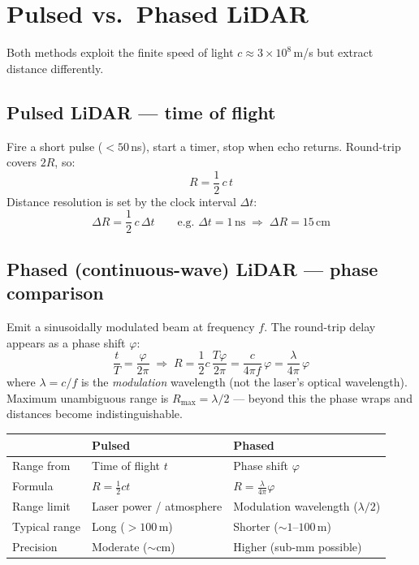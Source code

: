 \documentclass[12pt, a4paper]{article}
\begin{document}
\section*{Pulsed vs.\ Phased LiDAR}

Both methods exploit the finite speed of light $c \approx 3\times10^8$\,m/s but
extract distance differently.

\subsection*{Pulsed LiDAR --- time of flight}

Fire a short pulse ($<50$\,ns), start a timer, stop when echo returns.
Round-trip covers $2R$, so:
\[
  R = \frac{1}{2}\,c\,t
\]
Distance resolution is set by the clock interval $\Delta t$:
\[
  \Delta R = \frac{1}{2}\,c\,\Delta t
  \qquad \text{e.g.\ } \Delta t = 1\,\text{ns} \;\Rightarrow\; \Delta R = 15\,\text{cm}
\]

\subsection*{Phased (continuous-wave) LiDAR --- phase comparison}

Emit a sinusoidally modulated beam at frequency $f$.
The round-trip delay appears as a phase shift $\varphi$:
\[
  \frac{t}{T} = \frac{\varphi}{2\pi}
  \;\Longrightarrow\;
  R = \frac{1}{2}c\,\frac{T\varphi}{2\pi}
    = \frac{c}{4\pi f}\,\varphi
    = \frac{\lambda}{4\pi}\,\varphi
\]
where $\lambda = c/f$ is the \emph{modulation} wavelength (not the laser's
optical wavelength). Maximum unambiguous range is $R_{\max} = \lambda/2$
--- beyond this the phase wraps and distances become indistinguishable.

\begin{center}
\renewcommand{\arraystretch}{1.4}
\begin{tabular}{lll}
  \toprule
  & \textbf{Pulsed} & \textbf{Phased} \\
  \midrule
  Range from      & Time of flight $t$          & Phase shift $\varphi$ \\
  Formula         & $R = \tfrac{1}{2}ct$        & $R = \tfrac{\lambda}{4\pi}\varphi$ \\
  Range limit     & Laser power / atmosphere    & Modulation wavelength ($\lambda/2$) \\
  Typical range   & Long ($>100$\,m)            & Shorter ($\sim1$--$100$\,m) \\
  Precision       & Moderate ($\sim$cm)         & Higher (sub-mm possible) \\
  \bottomrule
\end{tabular}
\end{center}
\end{document}
